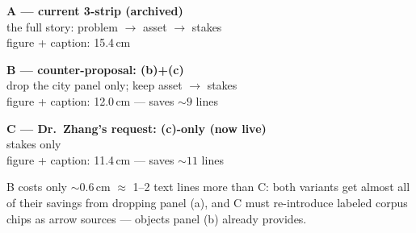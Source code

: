 \documentclass[10pt]{article}
\begin{document}
\begin{minipage}[t]{8.55cm}
  \textbf{A --- current 3-strip (archived)}\\[1pt]
  {\footnotesize the full story: problem $\to$ asset $\to$ stakes\\
   figure + caption: 15.4\,cm}\\[8pt]
  
\end{minipage}\hfill
\begin{minipage}[t]{8.55cm}
  \textbf{B --- counter-proposal: (b)+(c)}\\[1pt]
  {\footnotesize drop the city panel only; keep asset $\to$ stakes\\
   figure + caption: 12.0\,cm --- saves ${\sim}9$ lines}\\[8pt]
  
\end{minipage}\hfill
\begin{minipage}[t]{8.55cm}
  \textbf{C --- Dr.\ Zhang's request: (c)-only (now live)}\\[1pt]
  {\footnotesize stakes only\\
   figure + caption: 11.4\,cm --- saves ${\sim}11$ lines}\\[8pt]
  
\end{minipage}

\vspace{10pt}
{\footnotesize B costs only ${\sim}0.6$\,cm $\approx$ 1--2 text lines more
than C: both variants get almost all of their savings from dropping panel
(a), and C must re-introduce labeled corpus chips as arrow sources ---
objects panel (b) already provides.}
\end{document}
